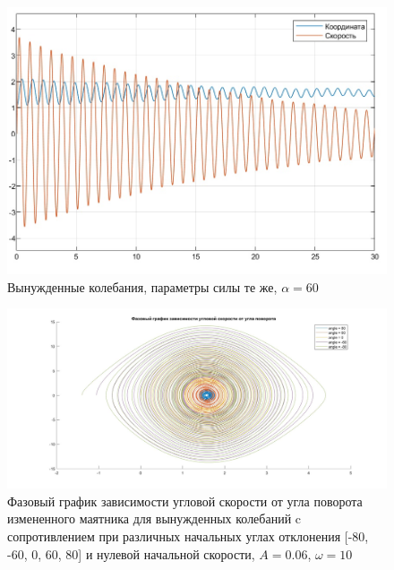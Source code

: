 \documentclass{article}
\begin{document}
	\begin{figure}[H]
		\centering
		\includegraphics[width=0.7\linewidth]{coord4}
		\caption{Вынужденные колебания, параметры силы те же, $\alpha = 60$}
		\label{fig:coord4}
	\end{figure}
	\begin{figure}[H]
		\centering
		\includegraphics[width=1.2\linewidth]{phase4}
		\caption{Фазовый график зависимости угловой скорости от угла поворота измененного маятника для вынужденных колебаний c сопротивлением при различных начальных углах отклонения [-80, -60, 0, 60, 80] и нулевой начальной скорости, $A = 0.06$, $\omega = 10$}
		\label{fig:phase4}
	\end{figure}
	
\end{document}
